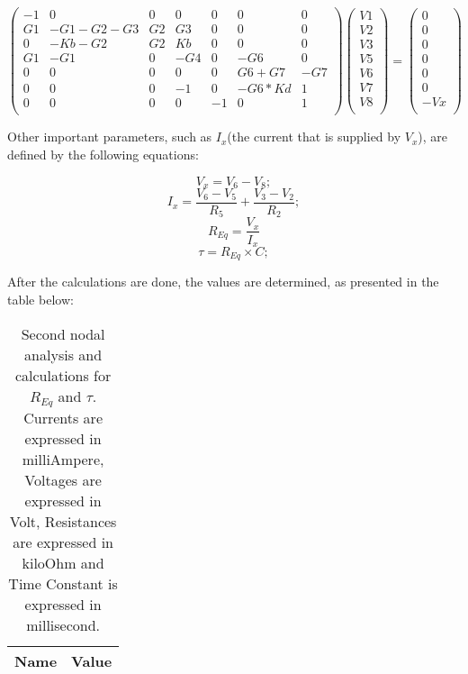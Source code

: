 \begin{equation}
\begin{pmatrix}
-1 & 0 & 0 & 0 & 0 & 0 & 0\\
G1 & -G1-G2-G3 & G2 & G3 & 0 & 0 & 0\\
0 & -Kb-G2 & G2 & Kb & 0 & 0 & 0\\
G1 & -G1 & 0 & -G4 & 0 & -G6 & 0\\
0 & 0 & 0 & 0 & 0 & G6+G7 & -G7\\
0 & 0 & 0 & -1 & 0 & -G6*Kd & 1\\
0 & 0 & 0 & 0 & -1 & 0 & 1\\
\end{pmatrix}
\begin{pmatrix}
V1\\
V2\\
V3\\
V5\\
V6\\
V7\\
V8\\
\end{pmatrix}
=
\begin{pmatrix}
0\\
0\\
0\\
0\\
0\\
0\\
-Vx\\
\end{pmatrix}
\end{equation}

Other important parameters, such as $I_x$(the current that is supplied by $V_x$), are defined by the following equations:

\begin{equation}
V_x=V_6-V_8;
\end{equation}
\begin{equation}
I_x=\frac {V_6-V_5}{R_5}+\frac {V_3-V_2}{R_2};
\end{equation}
\begin{equation}
	R_{Eq}=\frac {V_x}{I_x}
\end{equation}
\begin{equation}
	\tau=R_{Eq}\times C;
\end{equation}


After the calculations are done, the values are determined, as presented in the table below:

\begin{table}[h]
  \centering
  \begin{tabular}{|l|r|}
    \hline    
    {\bf Name} & {\bf Value} \\ \hline
     
  \end{tabular}
  \caption{Second nodal analysis and calculations for $R_{Eq}$ and $\tau$. Currents are expressed in milliAmpere, Voltages are expressed in Volt, Resistances are expressed in kiloOhm and Time Constant is expressed in millisecond.}
  \label{tab:theoretical2}
\end{table}

